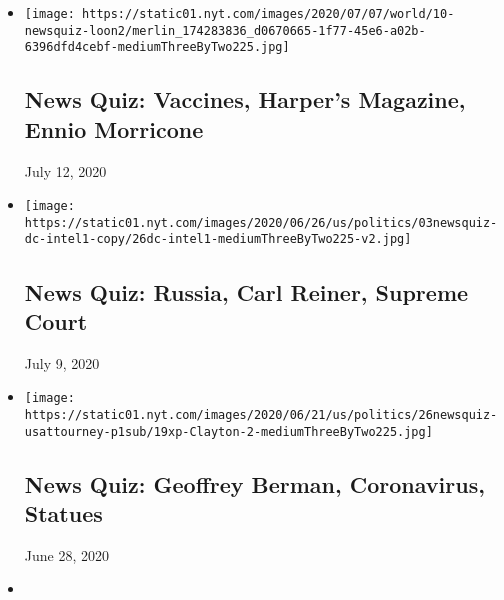 \begin{itemize}
\item
  \href{https://www.nytimes.com/interactive/2020/07/10/briefing/vaccines-harpers-magazine-ennio-morricone-news-quiz.html}{}

  \texttt{[image: https://static01.nyt.com/images/2020/07/07/world/10-newsquiz-loon2/merlin\_174283836\_d0670665-1f77-45e6-a02b-6396dfd4cebf-mediumThreeByTwo225.jpg]}

  \hypertarget{news-quiz-vaccines-harpers-magazine-ennio-morricone}{%
  \subsection{News Quiz: Vaccines, Harper's Magazine, Ennio
  Morricone}\label{news-quiz-vaccines-harpers-magazine-ennio-morricone}}

  July 12, 2020
\item
  \href{https://www.nytimes.com/interactive/2020/07/03/briefing/russia-carl-reiner-supreme-court-news-quiz.html}{}

  \texttt{[image: https://static01.nyt.com/images/2020/06/26/us/politics/03newsquiz-dc-intel1-copy/26dc-intel1-mediumThreeByTwo225-v2.jpg]}

  \hypertarget{news-quiz-russia-carl-reiner-supreme-court}{%
  \subsection{News Quiz: Russia, Carl Reiner, Supreme
  Court}\label{news-quiz-russia-carl-reiner-supreme-court}}

  July 9, 2020
\item
  \href{https://www.nytimes.com/interactive/2020/06/26/briefing/geoffrey-berman-coronavirus-statues-news-quiz.html}{}

  \texttt{[image: https://static01.nyt.com/images/2020/06/21/us/politics/26newsquiz-usattourney-p1sub/19xp-Clayton-2-mediumThreeByTwo225.jpg]}

  \hypertarget{news-quiz-geoffrey-berman-coronavirus-statues}{%
  \subsection{News Quiz: Geoffrey Berman, Coronavirus,
  Statues}\label{news-quiz-geoffrey-berman-coronavirus-statues}}

  June 28, 2020
\item
  \href{https://www.nytimes.com/interactive/2020/06/19/briefing/supreme-court-coronavirus-north-korea-news-quiz.html}{}


\end{itemize}
